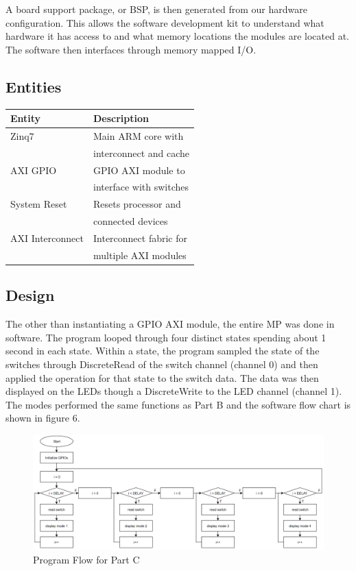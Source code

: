 \documentclass[letterpaper, 10 pt, conference]{IEEEconf}  %
\begin{document}
A board support package, or BSP, is then generated from our hardware configuration. This allows the software development kit to understand what hardware it has access to and what memory locations the modules are located at. The software then interfaces through memory mapped I/O.

\subsection{Entities}
\begin{table}[H]
\centering
\begin{tabular}{|l|l|}
\hline
\rowcolor[HTML]{EFEFEF} 
Entity           & Description \\ \hline
Zinq7            & Main ARM core with\\ 
                 & interconnect and cache \\ \hline
AXI GPIO         & GPIO AXI module to\\
                 & interface with switches \\ \hline
System Reset     & Resets processor and \\ 
                 & connected devices \\ \hline
AXI Interconnect & Interconnect fabric for \\ 
                 & multiple AXI modules \\ \hline
\end{tabular}
\end{table}

\subsection{Design}
The other than instantiating a GPIO AXI module, the entire MP was done in software. The program looped through four distinct states spending about 1 second in each state. Within a state, the program sampled the state of the switches through DiscreteRead of the switch channel (channel 0) and then applied the operation for that state to the switch data. The data was then displayed on the LEDs though a DiscreteWrite to the LED channel (channel 1). The modes performed the same functions as Part B and the software flow chart is shown in figure 6.

\begin{figure}[thpb]
   \centering
   \parbox{3in}{\centering\includegraphics[scale=0.2]{img/program_flow_chart.PNG}}
   \caption{Program Flow for Part C}
   \label{figurelabel}
\end{figure}
\end{document}
